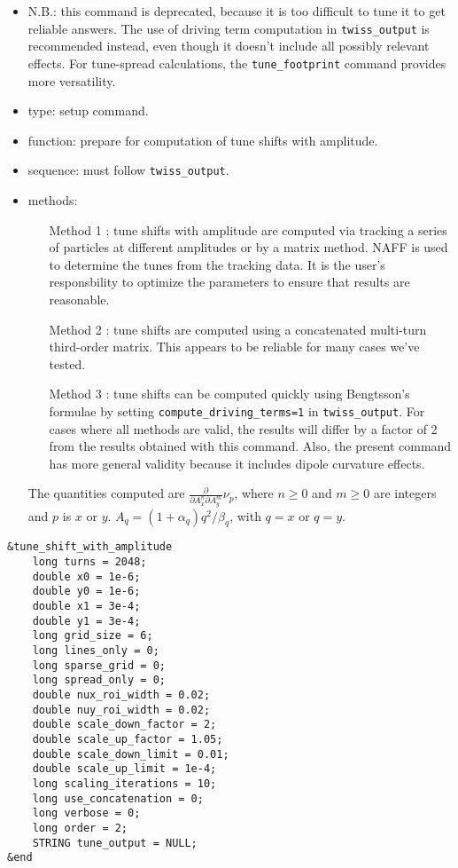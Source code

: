 \documentclass[11pt]{article}
\begin{document}
\begin{itemize}
\item N.B.: this command is deprecated, because it is too difficult to tune it to get
  reliable answers. The use of driving term computation in \verb|twiss_output| is recommended instead, even though it 
  doesn't include all possibly relevant effects. For tune-spread calculations, the \verb|tune_footprint| command provides
  more versatility.
\item type: setup command.
\item function: prepare for computation of tune shifts with amplitude.
\item sequence: must follow \verb|twiss_output|.
\item methods: 
\begin{itemize}
 \item[Method 1]: tune shifts with amplitude are computed via tracking a series of
  particles at different amplitudes or by a matrix method.  NAFF is used to 
  determine the tunes from the tracking data.  It is the user's responsbility to optimize the
  parameters to ensure that results are reasonable.  
 \item[Method 2]: tune shifts are computed using a concatenated multi-turn third-order matrix.
 This appears to be reliable for many cases we've tested.
 \item[Method 3]: tune shifts can be computed quickly using Bengtsson's formulae \cite{Bengtsson} by
 setting \verb|compute_driving_terms=1| in \verb|twiss_output|.  For cases where all methods are
 valid, the results will differ by a factor of 2 from the results obtained with this command.
 Also, the present command has more general validity because it includes dipole curvature effects.
\end{itemize}

The quantities computed are $\frac{\partial}{\partial A_x^n \partial A_y^m}\nu_p$, where $n\geq 0$ and $m \geq 0$ are
integers and $p$ is $x$ or $y$.  $A_q = (1 + \alpha_q) q^2/\beta_q$, with $q=x$ or $q=y$.

\end{itemize}

\begin{verbatim}
&tune_shift_with_amplitude
    long turns = 2048;
    double x0 = 1e-6;
    double y0 = 1e-6;
    double x1 = 3e-4;
    double y1 = 3e-4;
    long grid_size = 6;
    long lines_only = 0;
    long sparse_grid = 0;
    long spread_only = 0;
    double nux_roi_width = 0.02;
    double nuy_roi_width = 0.02;
    double scale_down_factor = 2;
    double scale_up_factor = 1.05;
    double scale_down_limit = 0.01;
    double scale_up_limit = 1e-4;
    long scaling_iterations = 10;
    long use_concatenation = 0;
    long verbose = 0;
    long order = 2;
    STRING tune_output = NULL;
&end
\end{verbatim}
\end{document}
